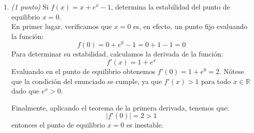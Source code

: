 \documentclass[12pt]{article}
\begin{document}
\begin{ejercicio}
\begin{enumerate}
                Dado que el enunciado establece que $f'(x) > 1$ para todo $x \in \mathbb{R}$, la función $f$ es estrictamente creciente. Aplicando la propiedad de monotonía a nuestra hipótesis:
                $$x_0 < x_1 \implies f(x_0) < f(x_1)$$
                Sustituyendo los valores del ciclo en la desigualdad obtenemos:
                $$x_1 < x_0$$
                Esto representa una contradicción con la suposición inicial $x_0 < x_1$. Por lo tanto, concluimos que no pueden existir 2-ciclos no triviales bajo estas condiciones.
                
            \item \emph{(1 punto)} Si $f(x) = x + e^x - 1$, determina la estabilidad del punto de equilibrio $x = 0$. \\
                En primer lugar, verificamos que $x = 0$ es, en efecto, un punto fijo evaluando la función:
                $$f(0) = 0 + e^0 - 1 = 0 + 1 - 1 = 0$$
                Para determinar su estabilidad, calculamos la derivada de la función:
                $$f'(x) = 1 + e^x$$
                Evaluando en el punto de equilibrio obtenemos $f'(0) = 1 + e^0 = 2$. Nótese que la condición del enunciado se cumple, ya que $f'(x) > 1$ para todo $x \in \mathbb{R}$ dado que $e^x > 0$.
                
                Finalmente, aplicando el teorema de la primera derivada, tenemos que:
                $$|f'(0)| = 2 > 1$$
                entonces el punto de equilibrio $x = 0$ es inestable.

        \end{enumerate}
    \end{ejercicio}
\end{document}
